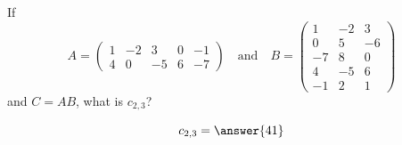 \documentclass{ximera}
\begin{document}
\begin{question} If
  \[
    A = \begin{pmatrix}
      1 & -2 & 3 & 0 & -1 \\
      4 & 0 & -5 & 6 & -7
    \end{pmatrix}\quad\text{and}\quad
    B=
    \begin{pmatrix}
      1 & -2 & 3 \\
      0 & 5 & -6 \\
      -7 & 8 & 0 \\
      4 & -5 & 6 \\
      -1 & 2 & 1
    \end{pmatrix}
  \]
  and $C = AB$, what is $c_{2,3}$?
  \begin{prompt}
    \[
      c_{2,3} = \answer{41}
    \]
  \end{prompt}
\end{question}












\end{document}
